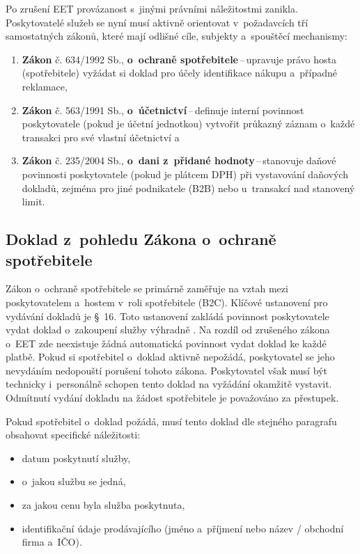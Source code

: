Po zrušení EET provázanost s~jinými právními náležitostmi zanikla.
Poskytovatelé služeb se nyní musí aktivně orientovat v~požadavcích tří samostatných zákonů, které mají odlišné cíle, subjekty a~spouštěcí mechanismy:
\begin{enumerate}
    \item \textbf{Zákon} č. 634/1992 Sb., \textbf{o~ochraně spotřebitele}\,--\,upravuje právo hosta (spotřebitele) vyžádat si doklad pro účely identifikace nákupu a~případné reklamace,
    \item \textbf{Zákon} č. 563/1991 Sb., \textbf{o~účetnictví}\,--\,definuje interní povinnost poskytovatele (pokud je účetní jednotkou) vytvořit průkazný záznam o~každé transakci pro své vlastní účetnictví a
    \item \textbf{Zákon} č. 235/2004 Sb., \textbf{o~dani z~přidané hodnoty}\,--\,stanovuje daňové povinnosti poskytovatele (pokud je plátcem DPH) při vystavování daňových dokladů, zejména pro jiné podnikatele (B2B) nebo u~transakcí nad stanovený limit.
\end{enumerate}

\subsection{Doklad z~pohledu Zákona o~ochraně spotřebitele}
\label{sec:ochrana-spotrebitele}
Zákon o~ochraně spotřebitele \cite{cz-1992-634} se primárně zaměřuje na vztah mezi poskytovatelem a~hostem v~roli spotřebitele (B2C).
Klíčové ustanovení pro vydávání dokladů je \S~16.   
Toto ustanovení zakládá povinnost poskytovatele vydat doklad o~zakoupení služby výhradně .
Na rozdíl od zrušeného zákona o~EET zde neexistuje žádná automatická povinnost vydat doklad ke každé platbě.
Pokud si spotřebitel o~doklad aktivně nepožádá, poskytovatel se jeho nevydáním nedopouští porušení tohoto zákona.
Poskytovatel však musí být technicky i~personálně schopen tento doklad na vyžádání okamžitě vystavit.
Odmítnutí vydání dokladu na žádost spotřebitele je považováno za přestupek.

Pokud spotřebitel o~doklad požádá, musí tento doklad dle stejného paragrafu obsahovat specifické náležitosti:
\begin{itemize}
    \item datum poskytnutí služby,
    \item o~jakou službu se jedná,
    \item za jakou cenu byla služba poskytnuta,
    \item identifikační údaje prodávajícího (jméno a~příjmení nebo název / obchodní firma a~IČO).
\end{itemize}

